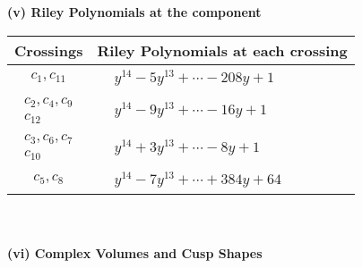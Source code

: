 \documentclass[1p]{elsarticle_modified}
\theoremstyle{definition}
\begin{document}
\newpage\renewcommand{\arraystretch}{1}
\flushleft \textbf{(v) Riley Polynomials at the component}\newline \\
\begin{tabular}{m{50pt}|m{274pt}}
Crossings & \hspace{64pt}Riley Polynomials at each crossing \\
\hline $$\begin{aligned}c_{1},c_{11}\end{aligned}$$&$\begin{aligned}
&y^{14}-5 y^{13}+\cdots-208 y+1
\end{aligned}$\\
\hline $$\begin{aligned}c_{2},c_{4},c_{9}\\c_{12}\end{aligned}$$&$\begin{aligned}
&y^{14}-9 y^{13}+\cdots-16 y+1
\end{aligned}$\\
\hline $$\begin{aligned}c_{3},c_{6},c_{7}\\c_{10}\end{aligned}$$&$\begin{aligned}
&y^{14}+3 y^{13}+\cdots-8 y+1
\end{aligned}$\\
\hline $$\begin{aligned}c_{5},c_{8}\end{aligned}$$&$\begin{aligned}
&y^{14}-7 y^{13}+\cdots+384 y+64
\end{aligned}$\\
\hline
\end{tabular}\\~\\
\newpage\flushleft \textbf{(vi) Complex Volumes and Cusp Shapes}
\end{document}
